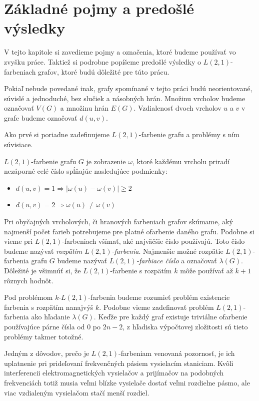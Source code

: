 \chapter{Základné pojmy a predošlé výsledky}

V tejto kapitole si zavedieme pojmy a označenia, ktoré budeme používať
vo zvyšku práce. Taktiež si podrobne popíšeme predošlé výsledky o
$L(2,1)$-farbeniach grafov, ktoré budú dôležité pre túto prácu.

Pokiaľ nebude povedané inak, grafy spomínané v tejto práci budú neorientované,
súvislé a jednoduché, bez slučiek a násobných hrán. Množinu vrcholov budeme
označovať $V(G)$ a množinu hrán $E(G)$. Vzdialenosť dvoch vrcholov $u$ a $v$
v grafe budeme označovať $d(u,v)$. 

Ako prvé si poriadne
zadefinujeme $L(2,1)$-farbenie grafu a problémy s ním súvisiace.

\begin{defn}
    $L(2,1)$-farbenie grafu $G$ je zobrazenie $\omega$, ktoré každému vrcholu priradí
    nezáporné celé číslo spĺňajúc nasledujúce podmienky:

    \begin{itemize}
        \item $d(u, v) = 1 \Rightarrow \left| \omega(u) - \omega(v) \right| \ge 2$
        \item $d(u, v) = 2 \Rightarrow \omega(u) \neq \omega(v)$
    \end{itemize}
\end{defn}

Pri obyčajných vrcholových, či hranových farbeniach grafov skúmame, aký
najmenší počet farieb potrebujeme pre platné ofarbenie daného grafu. Podobne
si vieme pri $L(2,1)$-farbeniach všímať, aké najväčšie číslo používajú. Toto
číslo budeme nazývať \emph{rozpätím $L(2,1)$-farbenia}. Najmenšie možné rozpätie
$L(2,1)$-farbenia grafu $G$ budeme nazývať \emph{$L(2,1)$-farbiace číslo} a
označovať $\lambda(G)$. Dôležité je všimnúť si, že $L(2,1)$-farbenie s
rozpätím $k$ môže používať až $k+1$ rôznych hodnôt.

Pod problémom $k$-$L(2,1)$-farbenia budeme rozumieť problém existencie farbenia
s rozpätím nanajvýš $k$. Podobne vieme zadefinovať problém $L(2,1)$-farbenia ako
hľadanie $\lambda(G)$. Keďže pre každý graf existuje triviálne ofarbenie
používajúce párne čísla od $0$ po $2n - 2$, z hľadiska výpočtovej zložitosti
sú tieto problémy takmer totožné.

Jedným z dôvodov, prečo je $L(2,1)$-farbeniam venovaná pozornosť, je ich uplatnenie
pri prideľovaní frekvenčných pásiem vysielacím staniciam. Kvôli interferencii
elektromagnetických vysielačov a prijímačov na podobných frekvenciách totiž
musia veľmi blízke vysielače dostať veľmi rozdielne pásmo, ale viac vzdialeným
vysielačom stačí menší rozdiel.

